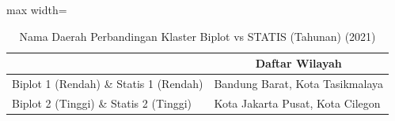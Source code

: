 \begin{table}[H]
\centering
\caption{Nama Daerah Perbandingan Klaster Biplot vs STATIS (Tahunan) (2021)} \label{tab:sample2biplot_statis_comp_name_2021}
\begin{adjustbox}{max width=\textwidth}
\begin{tabular}{|>{\centering\arraybackslash}p{4cm}|p{10cm}|}
\hline
\multicolumn{1}{|c|}{\textbf{Kategori}} & \multicolumn{1}{c|}{\textbf{Daftar Wilayah}} \\
\hline
Biplot 1 (Rendah) \& Statis 1 (Rendah) & Bandung Barat, Kota Tasikmalaya \\
\hline
Biplot 2 (Tinggi) \& Statis 2 (Tinggi) & Kota Jakarta Pusat, Kota Cilegon \\
\hline
\end{tabular}
\end{adjustbox}
\end{table}